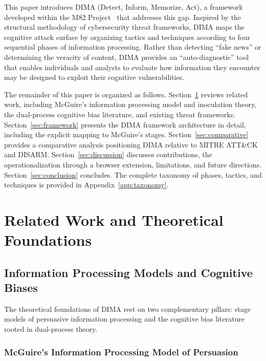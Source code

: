 \documentclass[11pt,a4paper]{article}
\begin{document}
This paper introduces DIMA (Detect, Inform, Memorize, Act), a framework developed within the M82 Project~\cite{boyer2024} that addresses this gap. Inspired by the structural methodology of cybersecurity threat frameworks, DIMA maps the cognitive attack surface by organizing tactics and techniques according to four sequential phases of information processing. Rather than detecting ``fake news'' or determining the veracity of content, DIMA provides an ``auto-diagnostic'' tool that enables individuals and analysts to evaluate how information they encounter may be designed to exploit their cognitive vulnerabilities.

The remainder of this paper is organized as follows. Section~\ref{sec:related} reviews related work, including McGuire's information processing model and inoculation theory, the dual-process cognitive bias literature, and existing threat frameworks. Section~\ref{sec:framework} presents the DIMA framework architecture in detail, including the explicit mapping to McGuire's stages. Section~\ref{sec:comparative} provides a comparative analysis positioning DIMA relative to MITRE ATT\&CK and DISARM. Section~\ref{sec:discussion} discusses contributions, the operationalization through a browser extension, limitations, and future directions. Section~\ref{sec:conclusion} concludes. The complete taxonomy of phases, tactics, and techniques is provided in Appendix~\ref{app:taxonomy}.

\section{Related Work and Theoretical Foundations}
\label{sec:related}

\subsection{Information Processing Models and Cognitive Biases}

The theoretical foundations of DIMA rest on two complementary pillars: stage models of persuasive information processing and the cognitive bias literature rooted in dual-process theory.

\subsubsection{McGuire's Information Processing Model of Persuasion}
\end{document}
